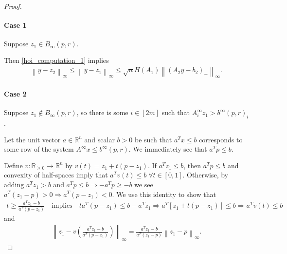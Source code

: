 \documentclass{article}
\theoremstyle{case}
\numberwithin{theorem}{subsection}
\newcommand{\atr}{A^{\infty}}
\newcommand{\btr}{b^{\infty}}
\newcommand{\bpr}{{B_{\infty}\left(p, r\right)}}
\newcommand{\Rn}{\mathbb R^n}
\begin{document}
\begin{proof}
\paragraph{Case 1}
Suppose $z_1 \in \bpr$.

Then \cref{hoi_computation_1} implies
\begin{align*}
\left\|y - z_2\right\|_{\infty}
\le \left\|y - z_1\right\|_{\infty}
\le \sqrt{n} H\left(A_1\right) \left\|\left(A_2y - b_2\right)_+\right\|_{\infty}.
\end{align*}

\paragraph{Case 2}
Suppose $z_1 \not \in \bpr$,
so there is some $i \in [2m]$ such that $\atr_{i} z_1 > \btr(p, r)_i$.

Let the unit vector $a \in \Rn$ and scalar $b > 0$ be such that $a^Tx \le b$ corresponds to some row of the system $\atr x \le \btr(p, r)$.
We immediately see that $a^Tp \le b$.

Define $v : \mathbb R_{\ge 0} \to \Rn$ by $v(t) = z_1 + t(p - z_1)$.
If $a^T z_1 \le b$, then $a^Tp \le b$ and convexity of half-spaces imply that  $a^Tv(t) \le b \; \forall t \in [0, 1]$.
Otherwise, by adding 
$a^Tz_1 > b$ and $a^Tp \le b \Longrightarrow -a^Tp \ge -b$ we see $a^T(z_1 - p) > 0 \Longrightarrow a^T(p - z_1) < 0$.
We use this identity to show that
\begin{align*}
t \ge \frac {a^Tz_1 - b} {a^T\left(p - z_1\right)}
\quad \textrm{implies} \quad
t a^T\left(p - z_1\right) \le b - a^Tz_1
\Longrightarrow a^T\left[z_1 + t \left(p - z_1\right)\right] \le b
\Longrightarrow a^Tv(t) \le b
\end{align*}
and
\begin{align*}
\left\|z_1 - v\left(\frac {a^Tz_1 - b} {a^T\left(p - z_1\right)}\right)\right\|_{\infty}
= \frac {a^Tz_1 - b} {a^T\left(z_1 - p\right)}\left\|z_1 - p\right\|_{\infty}.
\end{align*}


\end{proof}
\end{document}
